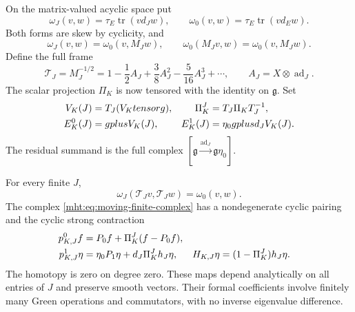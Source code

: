 On the matrix-valued acyclic space put
\[
 \omega_J(v,w)=\tau_E\operatorname{tr}(v d_Jw),\qquad
 \omega_0(v,w)=\tau_E\operatorname{tr}(v d_Ew).
\]
Both forms are skew by cyclicity, and
\begin{equation}\label{mht:eq:kinetic-self-adjoint}
 \omega_J(v,w)=\omega_0(v,M_Jw),\qquad
 \omega_0(M_Jv,w)=\omega_0(v,M_Jw).
\end{equation}
Define the full frame
\begin{equation}\label{mht:eq:full-cyclic-frame}
 \mathcal T_J=M_J^{-1/2}
 =1-\frac12A_J+\frac38A_J^2-\frac5{16}A_J^3+\cdots,
 \qquad A_J=X\otimes\operatorname{ad}_J.
\end{equation}
The scalar projection $\Pi_K$ is now tensored with the identity on
$\mathfrak g$. Set
\begin{align}
 V_K(J)&=\mathcal T_J(V_K\otimes\mathfrak g),&
 \Pi_K^J&=\mathcal T_J\Pi_K\mathcal T_J^{-1},\notag\\
 E_K^0(J)&=\mathfrak g\oplus V_K(J),&
 E_K^1(J)&=\eta_0\mathfrak g\oplus d_JV_K(J).
 \label{mht:eq:moving-finite-complex}
\end{align}
The residual summand is the full complex
$[\mathfrak g\xrightarrow{\operatorname{ad}_J}\mathfrak g\eta_0]$.

\begin{theorem}\label{mht:thm:moving-finite-contraction}
For every finite $J$,
\begin{equation}\label{mht:eq:moving-darboux}
 \omega_J(\mathcal T_Jv,\mathcal T_Jw)=\omega_0(v,w).
\end{equation}
The complex \eqref{mht:eq:moving-finite-complex} has a nondegenerate
cyclic pairing and the cyclic strong contraction
\begin{align}
 \mathsf p_{K,J}^0f&=P_0f+\Pi_K^J(f-P_0f),\notag\\
 \mathsf p_{K,J}^1\eta&=\eta_0P_1\eta+d_J\Pi_K^Jh_J\eta,&
 H_{K,J}\eta&=(1-\Pi_K^J)h_J\eta.
 \label{mht:eq:moving-finite-contraction}
\end{align}
The homotopy is zero on degree zero. These maps depend analytically
on all entries of $J$ and preserve smooth vectors. Their formal
coefficients involve finitely many Green operations and commutators,
with no inverse eigenvalue difference.
\end{theorem}

